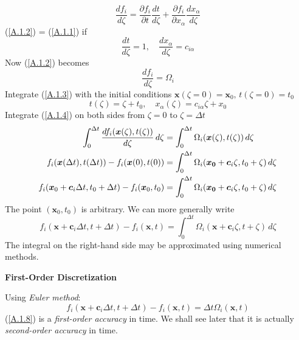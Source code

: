 \documentclass[draft]{article}
\begin{document}
\begin{equation}
	\frac{d f_i}{d \zeta} = \frac{\partial f_i}{\partial t}\frac{d t}{d \zeta} + \frac{\partial f_i}{\partial x_\alpha}\frac{d x_\alpha}{d \zeta} \label{A.1.2}
\end{equation}
(\ref{A.1.2}) = (\ref{A.1.1}) if
\begin{equation}
	\frac{d t}{d \zeta} = 1, \quad \frac{d x_\alpha}{d \zeta} = c_{i \alpha} \label{A.1.3}
\end{equation}
Now (\ref{A.1.2}) becomes
\begin{equation}
	\frac{d f_i}{d \zeta} = \Omega_i \label{A.1.4}
\end{equation}
Integrate (\ref{A.1.3}) with the initial conditions $\bm{x}(\zeta=0) = \bm{x}_0, \, t(\zeta=0) = t_0$
\begin{equation}
	t(\zeta) = \zeta + t_0, \quad x_\alpha(\zeta) = c_{i \alpha} \zeta + x_0
\end{equation}
Integrate (\ref{A.1.4}) on both sides from $\zeta = 0$ to $\zeta = \Delta t$
\begin{align}
	\int_{0}^{\Delta t} \frac{d f_i(\bm{x}(\zeta), t(\zeta))}{d \zeta} \, d \zeta &= \int_{0}^{\Delta t} \Omega_i(\bm{x}(\zeta), t(\zeta)) \, d \zeta \notag \\
	f_i(\bm{x}(\Delta t), t(\Delta t)) - f_i(\bm{x}(0), t(0)) &= \int_{0}^{\Delta t} \Omega_i(\bm{x_0} + \bm{c}_i \zeta, t_0 + \zeta) \, d \zeta \notag \\
	f_i(\bm{x}_0 + \bm{c}_i \Delta t, t_0 + \Delta t) - f_i(\bm{x}_0, t_0) &= \int_{0}^{\Delta t} \Omega_i(\bm{x_0} + \bm{c}_i \zeta, t_0 + \zeta) \, d \zeta
\end{align}
The point $(\bm{x}_0, t_0)$ is arbitrary. We can more generally write
\begin{equation}
		f_i(\bm{x} + \bm{c}_i \Delta t, t + \Delta t) - f_i(\bm{x}, t) = \int_{0}^{\Delta t} \Omega_i(\bm{x} + \bm{c}_i \zeta, t + \zeta) \, d \zeta
\end{equation}
The integral on the right-hand side may be approximated using numerical methods.

\vspace{1cm}
{\large\textbf{First-Order Discretization}}

Using \textit{Euler method}:
\begin{equation}
	f_i(\bm{x} + \bm{c}_i \Delta t, t + \Delta t) - f_i(\bm{x}, t) = \Delta t \Omega_i(\bm{x}, t) \label{A.1.8}
\end{equation}
(\ref{A.1.8}) is a \textit{first-order accuracy} in time. We shall see later that it is actually \textit{second-order accuracy} in time.
\end{document}

